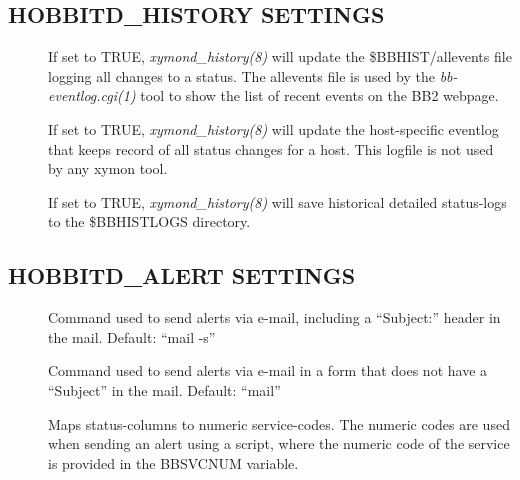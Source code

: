 \subsection{HOBBITD\_HISTORY SETTINGS}


 \begin{description}
\item[] If set to TRUE, \emph{xymond\_history(8)}
  will update the \$BBHIST/allevents file logging all changes to a
  status. The allevents file is used by the \emph{bb-eventlog.cgi(1)}
  tool to show the list of recent events on the BB2 webpage. 


 

\item[] If set to TRUE,
  \emph{xymond\_history(8)} will update the host-specific eventlog
  that keeps record of all status changes for a host. This logfile is
  not used by any xymon tool. 


 

\item[] If set to TRUE, \emph{xymond\_history(8)}
 will save historical detailed status-logs to the \$BBHISTLOGS directory. 

 


 


\end{description}

\subsection{HOBBITD\_ALERT SETTINGS}


 \begin{description}
\item[] Command used to send alerts via e-mail, including a ``Subject:'' header in the mail. Default: ``mail -s'' 

 

\item[] Command used to send alerts via e-mail in a form that does not have a ``Subject'' in the mail. Default: ``mail'' 

 

\item[] Maps status-columns to numeric
  service-codes. The numeric codes are used when sending an alert
  using a script, where the numeric code of the service is provided in
  the BBSVCNUM variable. 


 


 


\end{description}

